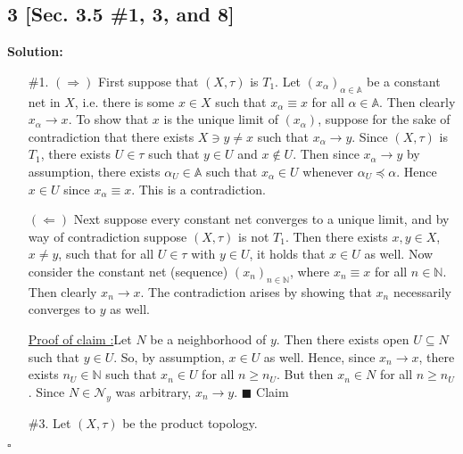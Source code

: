 \documentclass[12pt]{article}
\newcounter{ProofCounter}
\newcounter{ClaimCounter}[ProofCounter]
\newenvironment{Solution}{\stepcounter{ProofCounter}\textbf{Solution:}}{\hfill$\square$}
\newenvironment{claim}[1]{\vspace{1mm}\stepcounter{ClaimCounter}\par\noindent\underline{\bf Claim \theClaimCounter:}\space#1}{}
\newenvironment{claimproof}[1]{\par\noindent\underline{Proof of claim \theClaimCounter:}\space#1}{\hfill $\blacksquare$ Claim \theClaimCounter}
\begin{document}
\subsection*{3 [Sec. 3.5 \#1, 3, and 8]}
\begin{Solution}
  \begin{enumerate}
    \item[\#1.] $(\Rightarrow)$ First suppose that $(X, \tau)$ is $T_1$. Let $(x_\alpha)_{\alpha\in\mathbb{A}}$ be a constant net in $X$, i.e.
      there is some $x \in X$ such that $x_\alpha \equiv x$ for all $\alpha \in \mathbb{A}$. Then clearly $x_\alpha \rightarrow x$. To show that $x$
      is the unique limit of $(x_\alpha)$, suppose for the sake of contradiction that there exists $X \ni y \neq x$ such that $x_\alpha \rightarrow y$.
      Since $(X, \tau)$ is $T_1$, there exists $U \in \tau$ such that $y \in U$ and $x \notin U$. Then since $x_\alpha \rightarrow y$ by assumption,
      there exists $\alpha_U \in \mathbb{A}$ such that $x_\alpha \in U$ whenever $\alpha_U \preceq \alpha$. Hence $x \in U$ since $x_\alpha \equiv x$. 
      This is a contradiction.

      $(\Leftarrow)$ Next suppose every constant net converges to a unique limit, and by way of contradiction suppose $(X, \tau)$ is not $T_1$. Then
      there exists $x, y \in X$, $x \neq y$, such that for all $U \in \tau$ with $y \in U$, it holds that $x \in U$ as well. Now consider the constant
      net (sequence) $(x_n)_{n\in\mathbb{N}}$, where $x_n \equiv x$ for all $n \in \mathbb{N}$. Then clearly $x_n \rightarrow x$. The contradiction
      arises by showing that $x_n$ necessarily converges to $y$ as well.

      \begin{claimproof}
        Let $N$ be a neighborhood of $y$. Then there exists open $U \subseteq N$ such that $y \in U$. So, by assumption, $x \in U$ as well. Hence,
        since $x_n \rightarrow x$, there exists $n_U \in \mathbb{N}$ such that $x_n \in U$ for all $n \geq n_U$. But then $x_n \in N$ for all $n \geq
        n_U$. Since $N \in \mathcal{N}_y$ was arbitrary, $x_n \rightarrow y$.
      \end{claimproof}

    \item[\#3.] Let $(X, \tau)$ be the product topology.


\end{enumerate}
\end{Solution}
\end{document}
